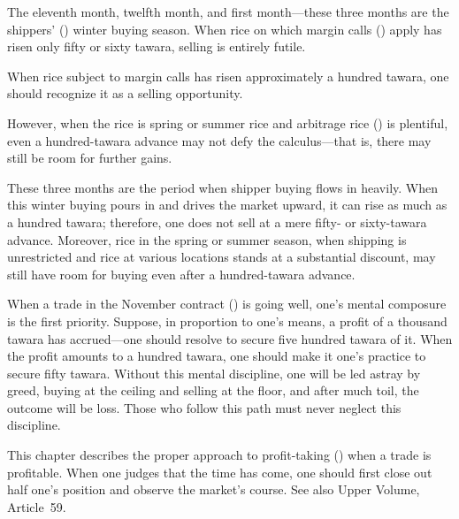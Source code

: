 
\begin{sokyubox}
{\small\itshape\color{sokyubar} }

\medskip
The eleventh month, twelfth month, and first month---these three months
are the shippers' () winter buying season. When rice on
which margin calls () apply has risen only fifty or
sixty tawara, selling is entirely futile.

When rice subject to margin calls has risen approximately a hundred
tawara, one should recognize it as a selling opportunity.

However, when the rice is spring or summer rice and arbitrage rice
() is plentiful, even a hundred-tawara advance may
not defy the calculus---that is, there may still be room for further
gains.
\end{sokyubox}

\commentary
These three months are the period when shipper buying flows in heavily.
When this winter buying pours in and drives the market upward, it can rise
as much as a hundred tawara; therefore, one does not sell at a mere fifty-
or sixty-tawara advance. Moreover, rice in the spring or summer season,
when shipping is unrestricted and rice at various locations stands at a
substantial discount, may still have room for buying even after a
hundred-tawara advance.


\begin{sokyubox}
{\small\itshape\color{sokyubar} }

\medskip
When a trade in the November contract () is
going well, one's mental composure is the first priority. Suppose, in
proportion to one's means, a profit of a thousand tawara has accrued---one
should resolve to secure five hundred tawara of it. When the profit
amounts to a hundred tawara, one should make it one's practice to secure
fifty tawara. Without this mental discipline, one will be led astray by
greed, buying at the ceiling and selling at the floor, and after much
toil, the outcome will be loss. Those who follow this path must never
neglect this discipline.
\end{sokyubox}

\commentary
This chapter describes the proper approach to profit-taking
() when a trade is profitable. When one judges that the
time has come, one should first close out half one's position and observe
the market's course. See also Upper Volume, Article~59.

